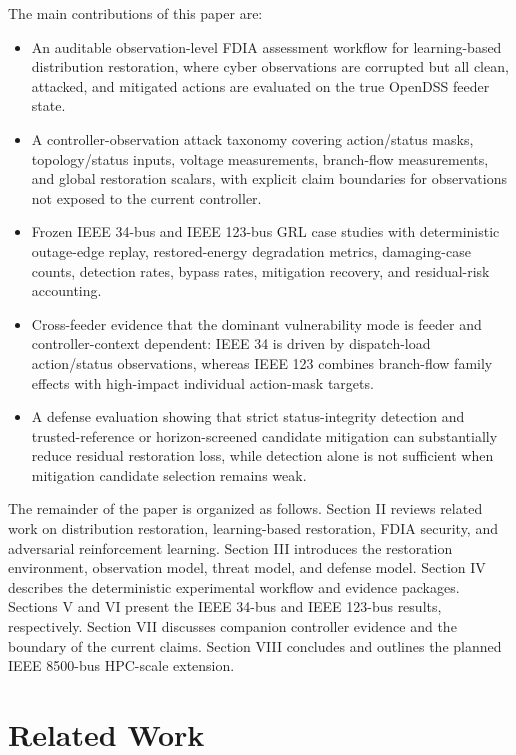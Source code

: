 The main contributions of this paper are:
\begin{itemize}
    \item An auditable observation-level FDIA assessment workflow for learning-based distribution restoration, where cyber observations are corrupted but all clean, attacked, and mitigated actions are evaluated on the true OpenDSS feeder state.
    \item A controller-observation attack taxonomy covering action/status masks, topology/status inputs, voltage measurements, branch-flow measurements, and global restoration scalars, with explicit claim boundaries for observations not exposed to the current controller.
    \item Frozen IEEE 34-bus and IEEE 123-bus GRL case studies with deterministic outage-edge replay, restored-energy degradation metrics, damaging-case counts, detection rates, bypass rates, mitigation recovery, and residual-risk accounting.
    \item Cross-feeder evidence that the dominant vulnerability mode is feeder and controller-context dependent: IEEE 34 is driven by dispatch-load action/status observations, whereas IEEE 123 combines branch-flow family effects with high-impact individual action-mask targets.
    \item A defense evaluation showing that strict status-integrity detection and trusted-reference or horizon-screened candidate mitigation can substantially reduce residual restoration loss, while detection alone is not sufficient when mitigation candidate selection remains weak.
\end{itemize}

The remainder of the paper is organized as follows. Section II reviews related work on distribution restoration, learning-based restoration, FDIA security, and adversarial reinforcement learning. Section III introduces the restoration environment, observation model, threat model, and defense model. Section IV describes the deterministic experimental workflow and evidence packages. Sections V and VI present the IEEE 34-bus and IEEE 123-bus results, respectively. Section VII discusses companion controller evidence and the boundary of the current claims. Section VIII concludes and outlines the planned IEEE 8500-bus HPC-scale extension.

\section{Related Work}

